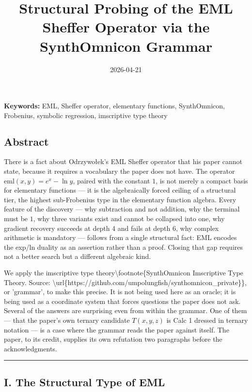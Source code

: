 \documentclass[12pt,a4paper]{article}
\begin{document}
\title{Structural Probing of the EML Sheffer Operator via the SynthOmnicon Grammar}
\date{2026-04-21}

\maketitle

\textbf{Keywords:} EML, Sheffer operator, elementary functions, SynthOmnicon, Frobenius, symbolic regression, imscriptive type theory

\subsection{Abstract}

There is a fact about Odrzywołek's EML Sheffer operator that his paper cannot
state, because it requires a vocabulary the paper does not have. The operator
$\text{eml}(x,y) = e^x - \ln y$, paired with the constant $1$, is not merely a
compact basis for elementary functions --- it is the algebraically forced ceiling
of a structural tier, the highest sub-Frobenius type in the elementary function
algebra. Every feature of the discovery --- why subtraction and not addition, why
the terminal must be $1$, why three variants exist and cannot be collapsed into
one, why gradient recovery succeeds at depth 4 and fails at depth 6, why complex
arithmetic is mandatory --- follows from a single structural fact: EML encodes the
exp/ln duality as an assertion rather than a proof. Closing that gap requires not
a better search but a different algebraic kind.

We apply the imscriptive type theory\textbackslash{}footnote\{SynthOmnicon Imscriptive Type Theory. Source: \textbackslash{}url\{https://github.com/umpolungfish/synthomnicon\_private\}\}, or 'grammar', to make this precise.
It is not being used here as an oracle; it is being used as a coordinate system that
forces questions the paper does not ask. Several of the answers are surprising
even from within the grammar. One of them --- that the paper's own ternary candidate
$T(x,y,z)$ is Calc 1 dressed in ternary notation --- is a case where the grammar
reads the paper against itself. The paper, to its credit, supplies its own
refutation two paragraphs before the acknowledgments.

\begin{center}
\rule{0.5\textwidth}{0.4pt}
\end{center}

\subsection{I. The Structural Type of EML}
\end{document}
